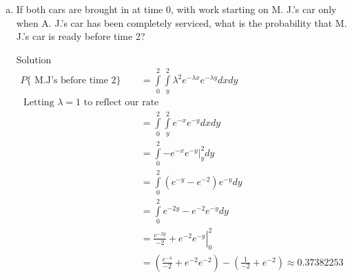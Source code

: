 \documentclass{article}
\begin{document}
\begin{spacing}{1.1}
\begin{homeworkProblem}
\begin{enumerate}[(a)]
\begin{homeworkSection}{Solution}
        Putting everything together, we find that the probability M.J.'s car is serviced before
        A.J's car is
        \begin{align*}
          P\{ \text{ M.J's care is serviced before A.J.'s car} \} 
            &= P\{\text{A.J. waits at least time} t \cap \text{A.J. gets service first after time} t\}\\
            &= P\{\text{A.J. waits at least time} t\} P\{\text{A.J. gets service first after time} t\}\\
            &= \left(\frac{ 1}{ 2}\right) (1 - (1 - e^{-t}))\\
            &= \left(\frac{ 1}{ 2}\right) ( e^{-t})\\
        \end{align*}
      \end{homeworkSection}
    \item If both cars are brought in at time 0, with work 
    starting on M. J.'s car only when A. J.'s car has been 
    completely serviced, what is the probability that M. J.'s 
    car is ready before time 2?
      \begin{homeworkSection}{Solution}
        \begin{align*}
          P\{ \text{ M.J's before time 2}\} 
          &= \int\limits_0^2 \int\limits_y^2 \lambda^2 e^{-\lambda x} e^{-\lambda y} dx dy\\
            \text{ Letting $\lambda = 1$ to reflect our rate}\\
          &= \int\limits_0^2 \int\limits_y^2 e^{-x} e^{-y} dx dy\\
          &= \int\limits_0^2 \left.-e^{-x} e^{-y}\right|_y^2 dy\\
          &= \int\limits_0^2 (e^{-y} - e^{-2}) e^{-y} dy\\
          &= \int\limits_0^2 e^{-2y} - e^{-2} e^{-y} dy\\
          &= \left.\frac{ e^{-2y}}{ -2} + e^{-2} e^{-y}\right|_0^2\\
          &= \left(\frac{ e^{-4}}{ -2} + e^{-2} e^{-2}\right) 
            - \left(\frac{ 1}{ -2} + e^{-2}\right)
        \approx 0.37382253
        \end{align*}
      \end{homeworkSection}
  \end{enumerate}
\end{homeworkProblem}


\end{spacing}
\end{document}
